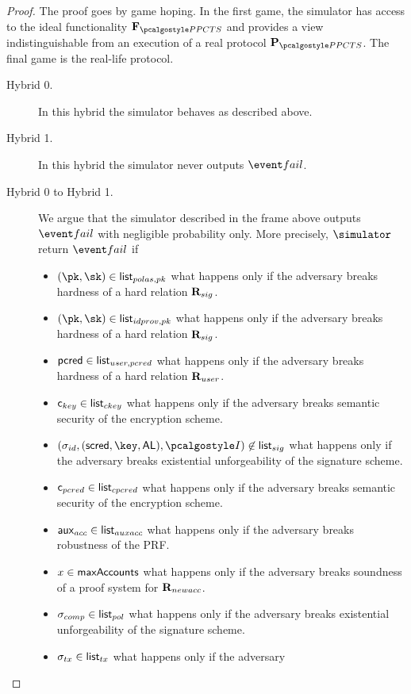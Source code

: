 \documentclass[runningheads,10pt]{llncs}
\numberwithin{equation}{section}
\begin{document}
\begin{proof}
  The proof goes by game hoping. In the first game, the simulator has access to
  the ideal functionality $\func{\PPCTS}$ and provides a view indistinguishable
  from an execution of a real protocol $\prot{\PPCTS}$. The final game is the
  real-life protocol.
  \begin{description}
  \item[Hybrid 0.] In this hybrid the simulator behaves as described above.
  \item[Hybrid 1.]  In this hybrid the simulator never outputs $\fail$.
  \item[Hybrid 0 to Hybrid 1.]
    We argue  that the simulator described in the frame above outputs $\fail$
    with negligible probability only. More precisely, $\simulator$ return
    $\fail$ if
    \begin{itemize}
    \item $(\pk, \sk) \in \listvar{polas,pk}$ what happens only if the
      adversary breaks hardness of a hard relation $\mathbf{R}_{sig}$.
    \item $(\pk, \sk) \in \listvar{idprov, pk}$ what happens only if the
      adversary breaks hardness of a hard relation $\mathbf{R}_{sig}$.
    \item $\mathsf{pcred} \in {\mathsf{list}_{user, pcred}}$ what happens only if the adversary
      breaks hardness of a hard relation $\mathbf{R}_{user}$.
    \item $\mathsf{c}_{key} \in {\mathsf{list}_{ckey}}$ what happens only if the adversary breaks
      semantic security of the encryption scheme.
    \item $(\signature_{id}, (\scred, \key, \AL), \idprov) \not\in
      \listvar{sig}$ what happens only if the adversary breaks existential
      unforgeability of the signature scheme.
    \item $\mathsf{c}_{pcred} \in {\mathsf{list}_{cpcred}}$ what happens only if the adversary
      breaks semantic security of the encryption scheme.
    \item $\mathsf{aux}_{acc} \in {\mathsf{list}_{auxacc}}$ what happens only if the adversary
      breaks robustness of the PRF.
    \item $x \in \mathsf{maxAccounts}$ what happens only if the adversary breaks soundness
      of a proof system for $\mathbf{R}_{newacc}$.
    \item $\sigma_{comp} \in {\mathsf{list}_{pol}}$ what happens only if the
      adversary breaks existential unforgeability of the signature scheme.
    \item $\sigma_{tx} \in {\mathsf{list}_{tx}}$ what happens only if the adversary

\end{itemize}
\end{description}
\end{proof}
\end{document}
